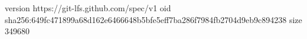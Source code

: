 version https://git-lfs.github.com/spec/v1
oid sha256:649fc471899a68d162e6466648b5bfe5eff7ba286f7984fb2704d9eb9c894238
size 349680
